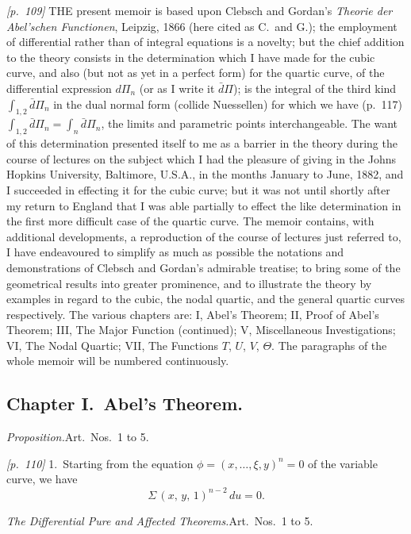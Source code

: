 \documentclass[11pt,a4paper]{article}
\theoremstyle{plain}
\theoremstyle{definition}
\theoremstyle{remark}
\begin{document}
\bigskip

\noindent\textit{[p.~109]} THE present memoir is based upon Clebsch and Gordan's \textit{Theorie der Abel'schen Functionen}, Leipzig, 1866 (here cited as C.\ and G.); the employment of differential rather than of integral equations is a novelty; but the chief addition to the theory consists in the determination which I have made for the cubic curve, and also (but not as yet in a perfect form) for the quartic curve, of the differential expression $d\Pi_n$ (or as I write it $\bar{d}\Pi$); is the integral of the third kind $\int_{1,2}\!\bar{d}\Pi_n$ in the dual normal form (collide Nuessellen) for which we have (p.~117) $\int_{1,2}\!\bar{d}\Pi_n = \int_n \bar{d}\Pi_n$, the limits and parametric points interchangeable. The want of this determination presented itself to me as a barrier in the theory during the course of lectures on the subject which I had the pleasure of giving in the Johns Hopkins University, Baltimore, U.S.A., in the months January to June, 1882, and I succeeded in effecting it for the cubic curve; but it was not until shortly after my return to England that I was able partially to effect the like determination in the first more difficult case of the quartic curve. The memoir contains, with additional developments, a reproduction of the course of lectures just referred to, I have endeavoured to simplify as much as possible the notations and demonstrations of Clebsch and Gordan's admirable treatise; to bring some of the geometrical results into greater prominence, and to illustrate the theory by examples in regard to the cubic, the nodal quartic, and the general quartic curves respectively. The various chapters are: I, Abel's Theorem; II, Proof of Abel's Theorem; III, The Major Function (continued); V, Miscellaneous Investigations; VI, The Nodal Quartic; VII, The Functions $T$, $U$, $V$, $\Theta$. The paragraphs of the whole memoir will be numbered continuously.

\subsection*{Chapter I.\ Abel's Theorem.}

\textit{Proposition.}\quad Art.\ Nos.\ 1 to 5.

\noindent\textit{[p.~110]} 1.\ Starting from the equation $\phi = (x, \ldots, \xi, y)^n = 0$ of the variable curve, we have
\[
\Sigma\,(x,\,y,\,1)^{n-2}\,du = 0.
\]

\textit{The Differential Pure and Affected Theorems.}\quad Art.\ Nos.\ 1 to 5.
\end{document}
